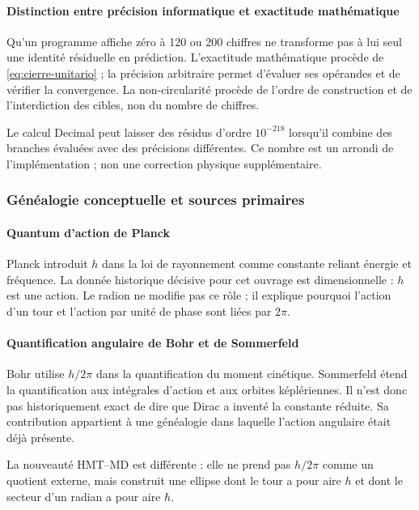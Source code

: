 \paragraph{Distinction entre précision informatique et exactitude mathématique}

Qu'un programme affiche zéro à 120 ou 200 chiffres ne transforme pas à lui seul une
identité résiduelle en prédiction. L'exactitude mathématique procède de
\eqref{eq:cierre-unitario} ; la précision arbitraire permet d'évaluer ses
opérandes et de vérifier la convergence. La non-circularité procède de l'ordre
de construction et de l'interdiction des cibles, non du nombre de chiffres.

Le calcul Decimal peut laisser des résidus d'ordre \(10^{-218}\) lorsqu'il combine
des branches évaluées avec des précisions différentes. Ce nombre est un arrondi de
l'implémentation ; non une correction physique supplémentaire.
\subsubsection{Généalogie conceptuelle et sources primaires}

\paragraph{Quantum d'action de Planck}

Planck introduit \(h\) dans la loi de rayonnement comme constante reliant énergie
et fréquence. La donnée historique décisive pour cet ouvrage est dimensionnelle :
\(h\) est une action. Le radion ne modifie pas ce rôle ; il explique pourquoi l'action
d'un tour et l'action par unité de phase sont liées par \(2\pi\).

\paragraph{Quantification angulaire de Bohr et de Sommerfeld}

Bohr utilise \(h/2\pi\) dans la quantification du moment cinétique. Sommerfeld étend
la quantification aux intégrales d'action et aux orbites képlériennes. Il n'est donc pas
historiquement exact de dire que Dirac a inventé la constante réduite. Sa
contribution appartient à une généalogie dans laquelle l'action angulaire était déjà
présente.

La nouveauté HMT--MD est différente : elle ne prend pas \(h/2\pi\) comme un quotient externe,
mais construit une ellipse dont le tour a pour aire \(h\) et dont le secteur d'un
radian a pour aire \(\hbar\).

